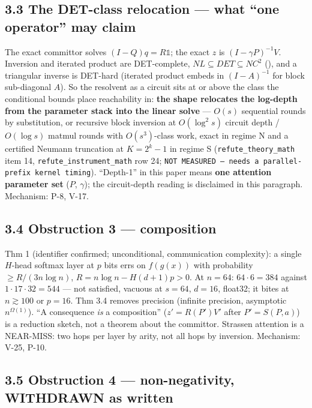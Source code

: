 \documentclass[11pt,a4paper]{article}
\theoremstyle{plain}
\theoremstyle{definition}
\theoremstyle{remark}
\begin{document}
\subsection{3.3 The DET-class relocation --- what ``one operator'' may
claim}\label{the-det-class-relocation-what-one-operator-may-claim}

The exact committor solves \((I-Q)q=R\mathbb 1\); the exact \(z\) is
\((I-\gamma P)^{-1}V\). Inversion and iterated product are DET-complete,
\(NL\subseteq DET\subseteq NC^2\) (\citep{cook-1985-taxonomy}), and a
triangular inverse is DET-hard (iterated product embeds in
\((I-A)^{-1}\) for block sub-diagonal \(A\)). So the resolvent as a
circuit sits at or above the class the conditional bounds place
reachability in: \textbf{the shape relocates the log-depth from the
parameter stack into the linear solve} --- \(O(s)\) sequential rounds by
substitution, or recursive block inversion at \(O(\log^2 s)\) circuit
depth / \(O(\log s)\) matmul rounds with \(O(s^3)\)-class work, exact in
regime N and a certified Neumann truncation at \(K=2^k-1\) in regime S
(\texttt{refute\_theory\_math} item 14,
\texttt{refute\_instrument\_math} row 24;
\texttt{NOT\ MEASURED\ —\ needs\ a\ parallel-prefix\ kernel\ timing}).
``Depth-1'' in this paper means \textbf{one attention parameter set}
(\(P\), \(\gamma\)); the circuit-depth reading is disclaimed in this
paragraph. Mechanism: P-8, V-17.

\subsection{3.4 Obstruction 3 ---
composition}\label{obstruction-3-composition}

\citep{peng-2024-transformer-limitations} Thm 1 (identifier confirmed;
unconditional, communication complexity): a single \(H\)-head softmax
layer at \(p\) bits errs on \(f(g(x))\) with probability
\(\ge R/(3n\log n)\), \(R=n\log n-H(d+1)p>0\). At \(n=64\):
\(64\cdot6=384\) against \(1\cdot17\cdot32=544\) --- not satisfied,
vacuous at \(s=64\), \(d=16\), float32; it bites at \(n\gtrsim100\) or
\(p=16\). \citep{kozachinskiy-2025-strassen} Thm 3.4 removes precision
(infinite precision, asymptotic \(n^{\Omega(1)}\)). ``A consequence
\emph{is} a composition'' (\(z'=R(P')V'\) after \(P'=S(P,a)\)) is a
reduction sketch, not a theorem about the committor. Strassen attention
is a NEAR-MISS: two hops per layer by arity, not all hops by inversion.
Mechanism: V-25, P-10.

\subsection{3.5 Obstruction 4 --- non-negativity, WITHDRAWN as
written}\label{obstruction-4-non-negativity-withdrawn-as-written}
\end{document}
